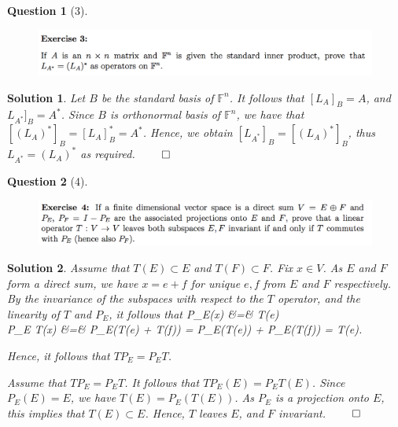 \documentclass{article} %
\def\eQb#1\eQe{\begin{eqnarray*}#1\end{eqnarray*}}
\theoremstyle{quest}
\newtheorem*{question}{Question}
\newtheorem*{solution}{Solution}
\begin{document}
\bigskip

\begin{question}[3]
\hfill
\begin{figure}[h!]
  \centering
    \includegraphics[width=1\textwidth]{LA-3-3.png}
\end{figure}
\end{question}
\begin{solution}
Let $B$ be the standard basis of $\mathbb{F}^n$. It follows that $[L_{A}]_{B} = A$,
and $L_{A^*}]_{B} = A^*$.  
Since $B$ is orthonormal basis of $\mathbb{F}^n$, we have that $[(L_{A})^*]_{B} = [L_{A}]_{B}^* = A^*$.
Hence, we obtain $[L_{A^*}]_{B} = [(L_{A})^*]_{B}$, thus $L_{A^*} = (L_{A})^*$ as required. 
\hfill $\qed$

\end{solution}

\bigskip

\begin{question}[4]
\hfill
\begin{figure}[h!]
  \centering
    \includegraphics[width=1\textwidth]{LA-3-4.png}
\end{figure}
\end{question}
\begin{solution}
Assume that $T(E) \subset E$ and $T(F) \subset F$. Fix $x \in V$.
As $E$ and $F$ form a direct sum, we have $x = e + f$ for unique $e,f$ from $E$ and $F$ respectively.
By the invariance of the subspaces with respect to the $T$ operator, and the linearity of $T$
and $P_{E}$, it follows that
\eQb
T P_{E}(x) &=& T(e) \\ 
P_{E} T(x) &=& P_{E}(T(e) + T(f))  = P_{E}(T(e)) + P_{E}(T(f)) = T(e). \\
\eQe

Hence, it follows that $T P_{E} = P_{E} T$. 

\smallskip

Assume that $T P_{E} = P_{E} T$. It follows that
$T P_{E}(E) = P_{E} T (E)$. Since $P_{E}(E) = E$, we have $T(E) = P_{E}(T(E))$. As $P_{E}$ is a projection
onto $E$, this implies that $T(E) \subset E$. Hence, $T$ leaves $E$, and $F$ invariant. 
\hfill $\qed$ 
\end{solution}
\end{document}
